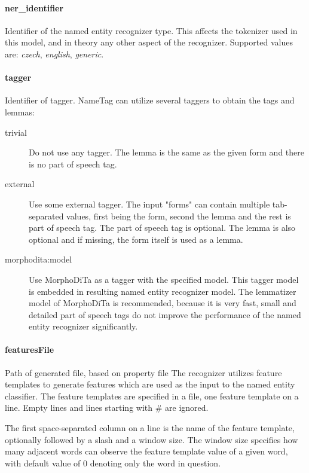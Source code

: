 \documentclass[12pt,a4paper]{report}
\begin{document}
\paragraph{ner\_identifier}
Identifier of the named entity recognizer type. This affects the tokenizer used
in this model, and in theory any other aspect of the recognizer. Supported values
are: \emph{czech}, \emph{english}, \emph{generic}.

\paragraph{tagger}
Identifier of tagger. NameTag can utilize several taggers to obtain the tags and lemmas:

\begin{description}
\item[trivial] Do not use any tagger. The lemma is the same as the given form and there is no part of speech tag.
\item[external] Use some external tagger. The input "forms" can contain multiple tab-separated values, first being the form, second the lemma and the rest is part of speech tag. The part of speech tag is optional. The lemma is also optional and if missing, the form itself is used as a lemma.
\item[morphodita:model] Use MorphoDiTa as a tagger with the specified model. This tagger model is embedded in resulting named entity recognizer model. The lemmatizer model of MorphoDiTa is recommended, because it is very fast, small and detailed part of speech tags do not improve the performance of the named entity recognizer significantly.
\end{description}

\paragraph{featuresFile}
Path of generated file, based on property file 
The recognizer utilizes feature templates to generate features which are used as the input to the named entity classifier. The feature templates are specified in a file, one feature template on a line. Empty lines and lines starting with \# are ignored.

The first space-separated column on a line is the name of the feature template, optionally followed by a slash and a window size. The window size specifies how many adjacent words can observe the feature template value of a given word, with default value of 0 denoting only the word in question.
\end{document}
